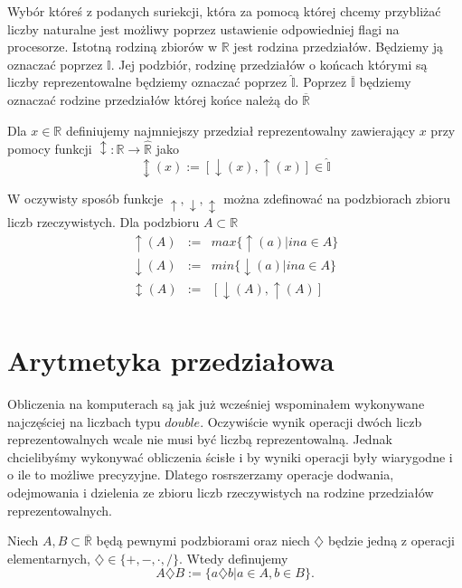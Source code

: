 Wybór któreś z podanych suriekcji, która za pomocą której chcemy przybliżać liczby naturalne jest możliwy poprzez 
ustawienie odpowiedniej flagi na procesorze.
Istotną rodziną zbiorów w $ \mathbb R $ jest rodzina przedziałów. Będziemy ją oznaczać poprzez $ \mathbb I $. 
Jej podzbiór, rodzinę przedziałów o końcach którymi są liczby reprezentowalne będziemy oznaczać poprzez $ \hat{\mathbb I } $.
Poprzez $ \overline { \mathbb I } $ będziemy oznaczać rodzine przedziałów której końce należą do $  \overline{\mathbb R} $

Dla $ x \in \mathbb R $ definiujemy najmniejszy przedział reprezentowalny zawierający $ x $ przy pomocy funkcji
$ \updownarrow : \mathbb R \to \hat{\mathbb R } $ jako
$$
    \updownarrow (x) := [\downarrow (x), \uparrow (x) ]\in \hat{\mathbb I } 
$$

W oczywisty sposób funkcje $ \uparrow, \downarrow, \updownarrow $ można zdefinować na podzbiorach zbioru liczb rzeczywistych.
Dla podzbioru $ A \subset \mathbb R $ 
\begin{eqnarray*}
    \uparrow (A) &:=& max \{ \uparrow (a) | in a \in A \} \\
    \downarrow (A) &:=& min \{ \downarrow (a) | in a \in A \} \\
    \updownarrow (A) &:=& [\downarrow(A),\uparrow(A)] \\
\end{eqnarray*}

\section{Arytmetyka przedziałowa}
Obliczenia na komputerach są jak już wcześniej wspominałem wykonywane najczęściej na liczbach typu $ double $.
Oczywiście wynik operacji dwóch liczb reprezentowalnych wcale nie musi być liczbą reprezentowalną.
Jednak chcielibyśmy wykonywać obliczenia ścisłe i by wyniki operacji były wiarygodne i o ile to możliwe precyzyjne.
Dlatego rosrszerzamy operacje dodwania, odejmowania i dzielenia ze zbioru liczb rzeczywistych na rodzine przedziałów 
reprezentowalnych.

Niech $ A,B  \subset \overline {\mathbb R } $ będą pewnymi podzbiorami oraz niech $ \diamondsuit $ będzie jedną z operacji elementarnych,
 $ \diamondsuit \in \{+,-,\cdot,/ \}.$ Wtedy definujemy 
 \begin{equation}
    A \diamondsuit B := \{ a \diamondsuit b | a \in A , b \in B  \}.
 \end{equation}

